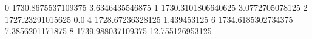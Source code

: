 0 1730.8675537109375 3.6346435546875
1 1730.3101806640625 3.0772705078125
2 1727.23291015625 0.0
4 1728.67236328125 1.439453125
6 1734.6185302734375 7.3856201171875
8 1739.988037109375 12.755126953125
